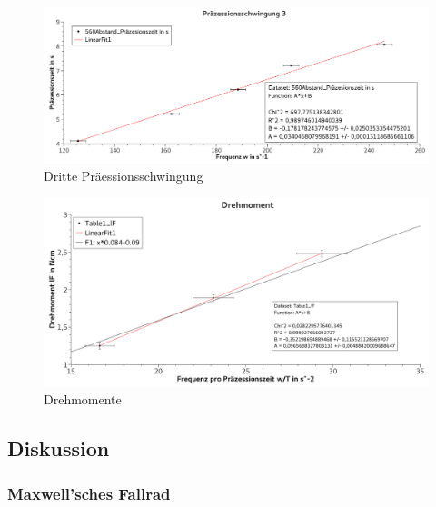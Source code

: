 \documentclass[
	a4paper,
	12pt,
	pagesize,
	ngerman
]{scrartcl}
\begin{document}
	\begin{figure}[tb]
		\includegraphics[width=1\textwidth]{Praez3}
		\centering
		\caption{Dritte Präessionsschwingung}
		\label{Praez3}
		\centering
	\end{figure}

	\begin{figure}[tb]
		\includegraphics[width=1\textwidth]{Drehmoment}
		\centering
		\caption{Drehmomente} %
		\label{Drehmoment}
		\centering
	\end{figure}




	\subsection{Diskussion}
	\subsubsection{Maxwell'sches Fallrad}
	
\end{document}
